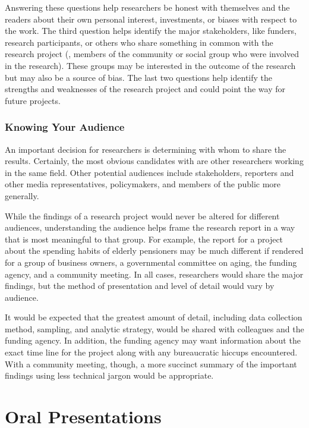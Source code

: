 Answering these questions help researchers be honest with themselves and the readers about their own personal interest, investments, or biases with respect to the work. The third question helps identify the major stakeholders, like funders, research participants, or others who share something in common with the research project (\eg, members of the community or social group who were involved in the research). These groups may be interested in the outcome of the research but may also be a source of bias. The last two questions help identify the strengths and weaknesses of the research project and could point the way for future projects.

\subsubsection{Knowing Your Audience}

An important decision for researchers is determining with whom to share the results. Certainly, the most obvious candidates with are other researchers working in the same field. Other potential audiences include stakeholders, reporters and other media representatives, policymakers, and members of the public more generally.

While the findings of a research project would never be altered for different audiences, understanding the audience helps frame the research report in a way that is most meaningful to that group. For example, the report for a project about the spending habits of elderly pensioners may be much different if rendered for a group of business owners, a governmental committee on aging, the funding agency, and a community meeting. In all cases, researchers would share the major findings, but the method of presentation and level of detail would vary by audience.

It would be expected that the greatest amount of detail, including data collection method, sampling, and analytic strategy, would be shared with colleagues and the funding agency. In addition, the funding agency may want information about the exact time line for the project along with any bureaucratic hiccups encountered. With a community meeting, though, a more succinct summary of the important findings using less technical jargon would be appropriate.

\section{Oral Presentations}


